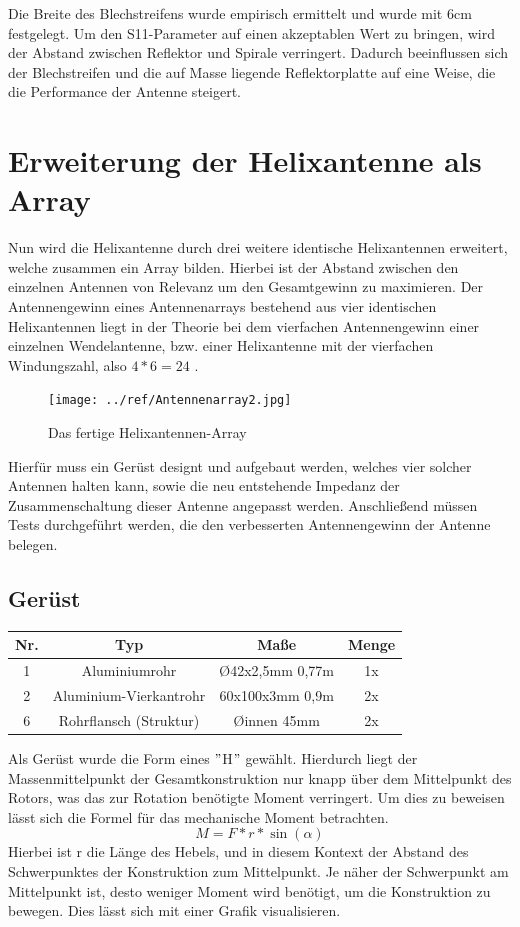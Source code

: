 Die Breite des Blechstreifens wurde empirisch ermittelt und wurde mit 6cm festgelegt. Um den S11-Parameter auf einen akzeptablen Wert zu bringen, wird der Abstand zwischen Reflektor und Spirale verringert. Dadurch beeinflussen sich der Blechstreifen und die auf Masse liegende Reflektorplatte auf eine Weise, die die Performance der Antenne steigert.

\section{Erweiterung der Helixantenne als Array}
Nun wird die Helixantenne durch drei weitere identische Helixantennen erweitert, welche zusammen ein Array bilden. Hierbei ist der Abstand zwischen den einzelnen Antennen von Relevanz um den Gesamtgewinn zu maximieren.
Der Antennengewinn eines Antennenarrays bestehend aus vier identischen Helixantennen liegt in der Theorie bei dem vierfachen Antennengewinn einer einzelnen Wendelantenne, bzw. einer Helixantenne mit der vierfachen Windungszahl, also $4*6=24$ \cite[p. 319]{Kraus-2002-AntennasB}.

\begin{figure}[h!]
	\centering
	\texttt{[image: ../ref/Antennenarray2.jpg]}
	\caption{Das fertige Helixantennen-Array}
	\label{fig:helixantennen-array}
\end{figure}

Hierfür muss ein Gerüst designt und aufgebaut werden, welches vier solcher Antennen halten kann, sowie die neu entstehende Impedanz der Zusammenschaltung dieser Antenne angepasst werden. Anschließend müssen Tests durchgeführt werden, die den verbesserten Antennengewinn der Antenne belegen.

\subsection{Gerüst}
\label{subsec:helix_geruest}
\begin{tabular}{|c|c|c|c|}
	\hline
	Nr. & Typ & Maße & Menge \\
	\hline
	1 & Aluminiumrohr & \O42x2,5mm 0,77m & 1x \\
	\hline
	2 & Aluminium-Vierkantrohr & 60x100x3mm 0,9m & 2x \\
	\hline
	6 & Rohrflansch (Struktur) & \O innen 45mm & 2x\\
	\hline
\end{tabular}

Als Gerüst wurde die Form eines $"$H$"$ gewählt. Hierdurch liegt der Massenmittelpunkt der Gesamtkonstruktion nur knapp über dem Mittelpunkt des Rotors, was das zur Rotation benötigte Moment verringert. Um dies zu beweisen lässt sich die Formel für das mechanische Moment betrachten.
\begin{equation}
	M=F*r*\sin(\alpha)
	\label{form:drehmoment}
\end{equation}
Hierbei ist r die Länge des Hebels, und in diesem Kontext der Abstand des Schwerpunktes der Konstruktion zum Mittelpunkt. Je näher der Schwerpunkt am Mittelpunkt ist, desto weniger Moment wird benötigt, um die Konstruktion zu bewegen. Dies lässt sich mit einer Grafik visualisieren.


